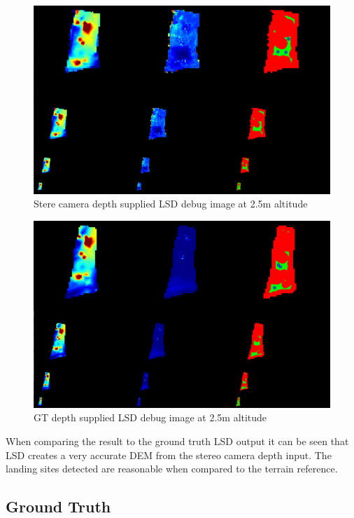 \begin{figure}[ht!]
    \centering
    \includegraphics[scale=0.25]{images/preparation/stereo_2.5m.png}
    \caption{Stere camera depth supplied LSD debug image at 2.5m altitude}
    \label{qual_stereo_test}
\end{figure}

\clearpage %

\begin{figure}[ht!]
    \centering
    \includegraphics[scale=0.25]{images/preparation/GT_2.5m.png}
    \caption{GT depth supplied LSD debug image at 2.5m altitude}
    \label{stereo_GT}
\end{figure}

When comparing the result to the ground truth LSD output it can be seen that LSD creates a very accurate DEM from the stereo camera depth input. The landing sites detected are reasonable when compared to the terrain reference. 

\subsection{Ground Truth}

